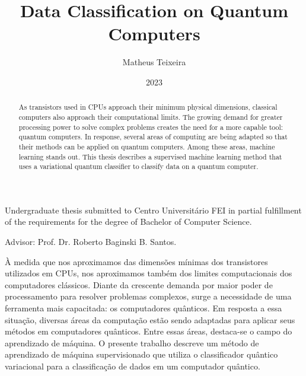 \documentclass[rascunho,xindy,table]{fei}
\author{Matheus Teixeira}
\title{Data Classification on Quantum Computers}
\date{2023}
\begin{document}
\maketitle

\begin{folhaderosto}
\raggedright
Undergraduate thesis submitted to Centro \mbox{Universitário} FEI in partial fulfillment of the requirements for the degree of Bachelor of Computer Science.

\medskip
Advisor: Prof. Dr. Roberto Baginski B. Santos.
\end{folhaderosto}



\begin{resumo}
\begin{otherlanguage}{brazil}
À medida que nos aproximamos das dimensões mínimas dos transistores utilizados em CPUs, nos aproximamos também dos limites computacionais dos computadores clássicos. Diante da crescente demanda por maior poder de processamento para resolver problemas complexos, surge a necessidade de uma ferramenta mais capacitada: os computadores quânticos. Em resposta a essa situação, diversas áreas da computação estão sendo adaptadas para aplicar seus métodos em computadores quânticos. Entre essas áreas, destaca-se o campo do aprendizado de máquina. O presente trabalho descreve um método de aprendizado de máquina supervisionado que utiliza o classificador quântico variacional para a classificação de dados em um computador quântico.

\end{otherlanguage}
\end{resumo}

\begin{abstract}
As transistors used in CPUs approach their minimum physical dimensions, classical computers also approach their computational limits. The growing demand for greater processing power to solve complex problems creates the need for a more capable tool: quantum computers. In response, several areas of computing are being adapted so that their methods can be applied on quantum computers. Among these areas, machine learning stands out. This thesis describes a supervised machine learning method that uses a variational quantum classifier to classify data on a quantum computer.

\end{abstract}
\end{document}
